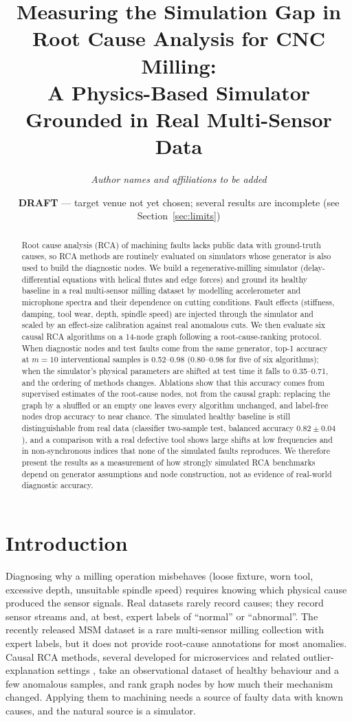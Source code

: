 \documentclass[11pt]{article}
\title{Measuring the Simulation Gap in Root Cause Analysis for CNC Milling:\\
A Physics-Based Simulator Grounded in Real Multi-Sensor Data}
\author{\textit{Author names and affiliations to be added}}
\date{\textbf{DRAFT} --- target venue not yet chosen; several results are incomplete (see Section~\ref{sec:limits})}
\begin{document}
\maketitle

\begin{abstract}
Root cause analysis (RCA) of machining faults lacks public data with ground-truth causes, so RCA methods are routinely evaluated on simulators whose generator is also used to build the diagnostic nodes.
We build a regenerative-milling simulator (delay-differential equations with helical flutes and edge forces) and ground its healthy baseline in a real multi-sensor milling dataset by modelling accelerometer and microphone spectra and their dependence on cutting conditions.
Fault effects (stiffness, damping, tool wear, depth, spindle speed) are injected through the simulator and scaled by an effect-size calibration against real anomalous cuts.
We then evaluate six causal RCA algorithms on a 14-node graph following a root-cause-ranking protocol.
When diagnostic nodes and test faults come from the same generator, top-1 accuracy at $m{=}10$ interventional samples is 0.52--0.98 (0.80--0.98 for five of six algorithms); when the simulator's physical parameters are shifted at test time it falls to 0.35--0.71, and the ordering of methods changes.
Ablations show that this accuracy comes from supervised estimates of the root-cause nodes, not from the causal graph: replacing the graph by a shuffled or an empty one leaves every algorithm unchanged, and label-free nodes drop accuracy to near chance.
The simulated healthy baseline is still distinguishable from real data (classifier two-sample test, balanced accuracy $0.82\pm0.04$), and a comparison with a real defective tool shows large shifts at low frequencies and in non-synchronous indices that none of the simulated faults reproduces.
We therefore present the results as a measurement of how strongly simulated RCA benchmarks depend on generator assumptions and node construction, not as evidence of real-world diagnostic accuracy.
\end{abstract}

\section{Introduction}
Diagnosing why a milling operation misbehaves (loose fixture, worn tool, excessive depth, unsuitable spindle speed) requires knowing which physical cause produced the sensor signals.
Real datasets rarely record causes; they record sensor streams and, at best, expert labels of ``normal'' or ``abnormal''.
The recently released MSM dataset \citep{kim2026msm} is a rare multi-sensor milling collection with expert labels, but it does not provide root-cause annotations for most anomalies.
Causal RCA methods, several developed for microservices \citep{ikram2022rcd,pham2024baro} and related outlier-explanation settings \citep{orchard2025}, take an observational dataset of healthy behaviour and a few anomalous samples, and rank graph nodes by how much their mechanism changed.
Applying them to machining needs a source of faulty data with known causes, and the natural source is a simulator.
\end{document}

